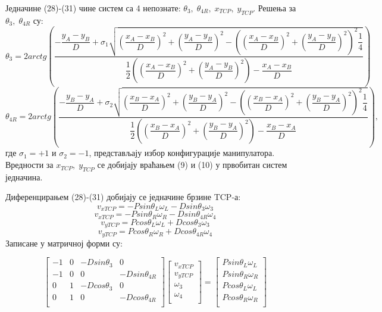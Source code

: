 \documentclass[12pt]{article}
\begin{document}
Једначине (28)-(31) чине систем са 4 непознате: $\theta_3,\;\theta_{4R},\;x_{TCP},\;y_{TCP}$. Решења за $\theta_3,\;\theta_{4R}$ су:
\begin{equation}
    \theta_3 = 2arctg\left(\dfrac{-\dfrac{y_A - y_B}{D} + \sigma_1\sqrt{\left(\dfrac{x_A-x_B}{D}\right)^2+\left(\dfrac{y_A-y_B}{D}\right)^2-\left(\left(\dfrac{x_A-x_B}{D}\right)^2+\left(\dfrac{y_A-y_B}{D}\right)^2\right)^2\dfrac{1}{4}}}{\dfrac{1}{2}\left(\left(\dfrac{x_A-x_B}{D}\right)^2+\left(\dfrac{y_A-y_B}{D}\right)^2\right)-\dfrac{x_A-x_B}{D}}\right)
\end{equation}
\begin{equation}
    \theta_{4R} = 2arctg\left(\dfrac{-\dfrac{y_B - y_A}{D} + \sigma_2\sqrt{\left(\dfrac{x_B-x_A}{D}\right)^2+\left(\dfrac{y_B-y_A}{D}\right)^2-\left(\left(\dfrac{x_B-x_A}{D}\right)^2+\left(\dfrac{y_B-y_A}{D}\right)^2\right)^2\dfrac{1}{4}}}{\dfrac{1}{2}\left(\left(\dfrac{x_B-x_A}{D}\right)^2+\left(\dfrac{y_B-y_A}{D}\right)^2\right)-\dfrac{x_B-x_A}{D}}\right),
\end{equation}
где $\sigma_1=+1$ и $\sigma_2=-1$, представљају избор конфигурације манипулатора. Вредности за $x_{TCP},\;y_{TCP}$ се добијају враћањем (9) и (10) у првобитан систем једначина.

Диференцирањем (28)-(31) добијају се једначине брзине TCP-а:
\begin{equation}
    v_{xTCP} = -Psin\theta_L\omega_L - Dsin\theta_3\omega_3
\end{equation}
\begin{equation}
    v_{xTCP} = -Psin\theta_R\omega_R - Dsin\theta_{4R}\omega_4
\end{equation}
\begin{equation}
    v_{yTCP} = Pcos\theta_L\omega_L + Dcos\theta_3\omega_3
\end{equation}
\begin{equation}
    v_{yTCP} = Pcos\theta_R\omega_R + Dcos\theta_{4R}\omega_4
\end{equation}
Записане у матричној форми су:

\begin{equation}
\begin{bmatrix}
-1 & 0 & -Dsin\theta_3 & 0\\
-1 & 0 & 0 & -Dsin\theta_{4R}\\
0 & 1 & -Dcos\theta_3 & 0\\
0 & 1 & 0 & -Dcos\theta_{4R}\\
\end{bmatrix}
\begin{bmatrix}
v_{xTCP}\\
v_{yTCP}\\
\omega_3\\
\omega_4\\
\end{bmatrix}
=
\begin{bmatrix}
Psin\theta_L\omega_L\\
Psin\theta_R\omega_R\\
Pcos\theta_L\omega_L\\
Pcos\theta_R\omega_R\\
\end{bmatrix}
\end{equation}
\end{document}
